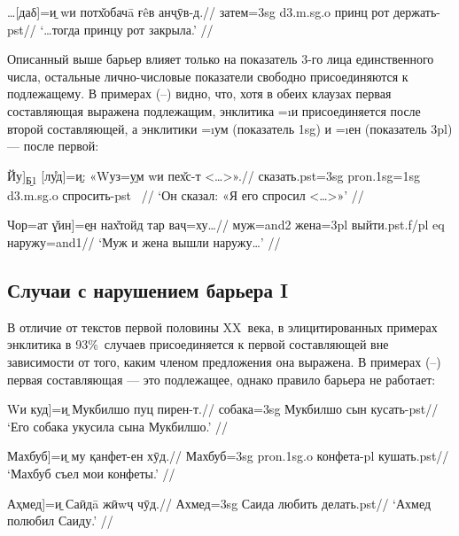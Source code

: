 \begingl
\gla …{[}даδ{]}=\b{и} wи потх̌обачā ғêв анҷӯв-д.//
\glc затем={\sc 3sg} {\sc d3.m.sg.o} принц рот держать-{\sc pst}//
\glft ‘…тогда принцу рот закрыла.’ //
\endgl \xe

Описанный выше барьер влияет только на показатель 3-го лица единственного числа, остальные лично-числовые показатели свободно присоединяются к подлежащему. В примерах (–) видно, что, хотя в обеих клаузах первая составляющая выражена подлежащим, энклитика =\i{и} присоединяется после второй составляющей, а энклитики =\i{ум} (показатель {\sc 1sg}) и =\i{ен} (показатель {\sc 3pl}) — после первой:

\begingl
\gla {[}Йу{]}\textsubscript{\b{Б1}} {[}лу̊д{]}=\b{и}: «Wуз=\b{ум} wи пех̌с-т <…>».//
 сказать.{\sc pst=3sg} {\sc pron.1sg=1sg} {\sc d3.m.sg.o} спросить-{\sc pst} ~//
\glft ‘Он сказал: «Я его спросил <…>»’ //
\endgl \xe

\begingl
\gla {[}Чор=ат ɣ̌ин{]}=\b{ен} нах̌тойд тар ваҷ=ху…//
\glc муж={\sc and2} жена={\sc 3pl} выйти.{\sc pst.f/pl} {\sc eq} наружу={\sc and1}//
\glft ‘Муж и жена вышли наружу…’ //
\endgl \xe

\subsection{Случаи с нарушением барьера I} \label{clit-barone-cases}

В отличие от текстов первой половины XX~века, в элицитированных примерах энклитика в 93\%~случаев присоединяется к первой составляющей вне зависимости от того, каким членом предложения она выражена. В примерах (–) первая составляющая — это подлежащее, однако правило барьера не работает:

\begingl
\gla {[}Wи куд{]}=\b{и} Мукбилшо пуц пирен-т.//
 собака={\sc 3sg} Мукбилшо сын кусать-{\sc pst}//
\glft ‘Его собака укусила сына Мукбилшо.’ \trailingcitation{[элицитация, 2019]}//
\endgl \xe

\begingl
\gla {[}Махбуб{]}=\b{и} му қанфет-ен хӯд.//
\glc Махбуб={\sc 3sg} {\sc pron.1sg.o} конфета-{\sc pl} кушать.{\sc pst}//
\glft ‘Махбуб съел мои конфеты.’ \trailingcitation{[элицитация, 2019]}//
\endgl \xe

\begingl
\gla {[}Аҳмед{]}=\b{и} Саӣдā жӣwҷ чӯд.//
\glc Ахмед={\sc 3sg} Саида любить делать.{\sc pst}//
\glft ‘Ахмед полюбил Саиду.’ \trailingcitation{[элицитация, 2019]}//
\endgl \xe

